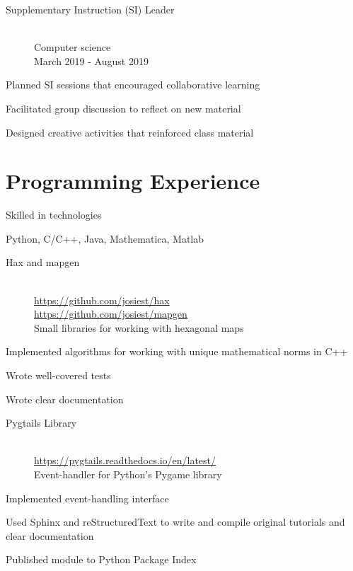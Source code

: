 \documentclass[10pt]{article}
\newenvironment{itemize*}
{\begin{itemize}[leftmargin=*]
    \setlength{\itemsep}{0pt}
    \setlength{\parskip}{0pt}}
{\end{itemize}}
\begin{document}
\begin{paracol}{2}
\begin{description}
\item[Supplementary Instruction (SI) Leader]~\\
    Computer science\\
    March 2019 - August 2019
\end{description}
\begin{itemize*}
\item Planned SI sessions that encouraged collaborative learning
\item Facilitated group discussion to reflect on new material
\item Designed creative activities that reinforced class material
\end{itemize*}

\switchcolumn
\section*{Programming Experience}
\begin{description}
\item[Skilled in technologies]
\end{description}
\begin{itemize*}
\item Python, C/C++, Java, Mathematica, Matlab
\end{itemize*}

\begin{description}
\item[Hax and mapgen]~\\
    \url{https://github.com/josiest/hax}\\
    \url{https://github.com/josiest/mapgen}\\
    Small libraries for working with hexagonal maps
\end{description}
\begin{itemize*}
\item Implemented algorithms for working with unique mathematical norms in C++
\item Wrote well-covered tests
\item Wrote clear documentation
\end{itemize*}

\begin{description}
\item[Pygtails Library]~\\
    \url{https://pygtails.readthedocs.io/en/latest/}\\
    Event-handler for Python's Pygame library
\end{description}
\begin{itemize*}
\item Implemented event-handling interface
\item Used Sphinx and reStructuredText to write and compile original tutorials and clear
      documentation
\item Published module to Python Package Index
\end{itemize*}


\end{paracol}
\end{document}
